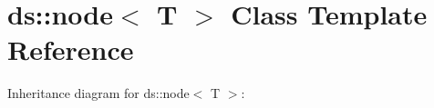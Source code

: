 \hypertarget{classds_1_1node}{}\section{ds\+:\+:node$<$ T $>$ Class Template Reference}
\label{classds_1_1node}


Inheritance diagram for ds\+:\+:node$<$ T $>$\+:
